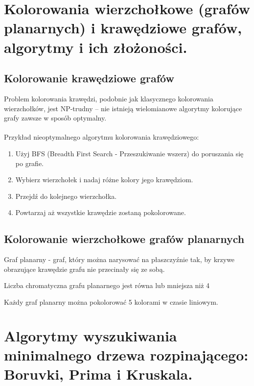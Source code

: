 \documentclass[main.tex]{subfiles}
\begin{document}
    \newpage

    \section{Kolorowania wierzchołkowe (grafów planarnych) i krawędziowe grafów, algorytmy i ich złożoności.}

    \subsection{Kolorowanie krawędziowe grafów}
    Problem kolorowania krawędzi, podobnie jak klasycznego kolorowania wierzchołków, jest NP-trudny – nie istnieją wielomianowe algorytmy kolorujące grafy zawsze w sposób optymalny.
    \\\\
    Przykład nieoptymalnego algorytmu kolorowania krawędziowego:
    \begin{enumerate}
        \item Użyj BFS (Breadth First Search - Przeszukiwanie wszerz) do poruszania się po grafie.
        \item Wybierz wierzchołek i nadaj różne kolory jego krawędziom.
        \item Przejdź do kolejnego wierzchołka.
        \item Powtarzaj aż wszystkie krawędzie zostaną pokolorowane.
    \end{enumerate}

    \subsection{Kolorowanie wierzchołkowe grafów planarnych}

    \begin{definition}
        Graf planarny - graf, który można narysować na płaszczyźnie tak, by krzywe obrazujące krawędzie grafu nie przecinały się ze sobą.
    \end{definition}

    \begin{theorem}
        Liczba chromatyczna grafu planarnego jest równa lub mniejsza niż 4
    \end{theorem}

    Każdy graf planarny można pokolorować 5 kolorami w czasie liniowym.





    \newpage

    \section{Algorytmy wyszukiwania minimalnego drzewa rozpinającego: Boruvki, Prima i Kruskala.}
\end{document}
